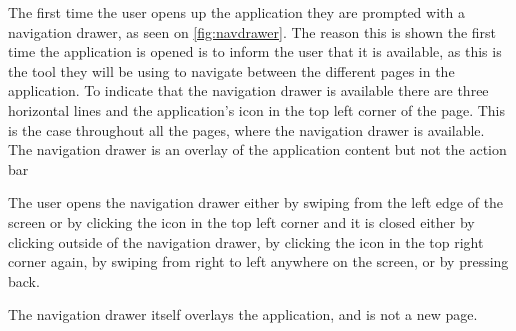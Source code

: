 The first time the user opens up the application they are prompted with a navigation drawer, as seen on \autoref{fig:navdrawer}. The reason this is shown the first time the application is opened is to inform the user that it is available, as this is the tool they will be using to navigate between the different pages in the application. To indicate that the navigation drawer is available there are three horizontal lines and the application's icon in the top left corner of the page. This is the case throughout all the pages, where the navigation drawer is available. The navigation drawer is an overlay of the application content but not the action bar

The user opens the navigation drawer either by swiping from the left edge of the screen or by clicking the icon in the top left corner and it is closed either by clicking outside of the navigation drawer, by clicking the icon in the top right corner again, by swiping from right to left anywhere on the screen, or by pressing back.

The navigation drawer itself overlays the application, and is not a new page.\citep{diamond}